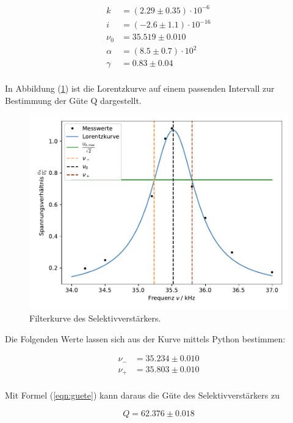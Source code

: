 \begin{align*}
    k      &= (2.29\pm0.35)\cdot 10^{-6}\\
    i      &= (-2.6\pm1.1)\cdot 10^{-16}\\
    \nu_0  &= 35.519\pm0.010\\
    \alpha &= (8.5\pm0.7) \cdot 10^2\\
    \gamma &= 0.83\pm0.04\\
\end{align*}

\noindent
In Abbildung (\ref{fig:guete}) ist die Lorentzkurve auf einem passenden Intervall zur Bestimmung der Güte Q dargestellt.

\begin{figure}
    \centering
       \includegraphics[width=\textwidth]{Daten/x7.pdf}
       \caption{Filterkurve des Selektivverstärkers.}
       \label{fig:guete}
\end{figure}

\noindent
Die Folgenden Werte lassen sich aus der Kurve mittels Python bestimmen: 

\begin{align*}
\nu_- &= 35.234 \pm 0.010 \\
\nu_+ &= 35.803 \pm 0.010 \\
\end{align*}

\noindent
Mit Formel (\ref{eqn:guete}) kann daraus die Güte des Selektivverstärkers zu 

\begin{equation*}
    Q = 62.376 \pm 0.018 
\end{equation*}

